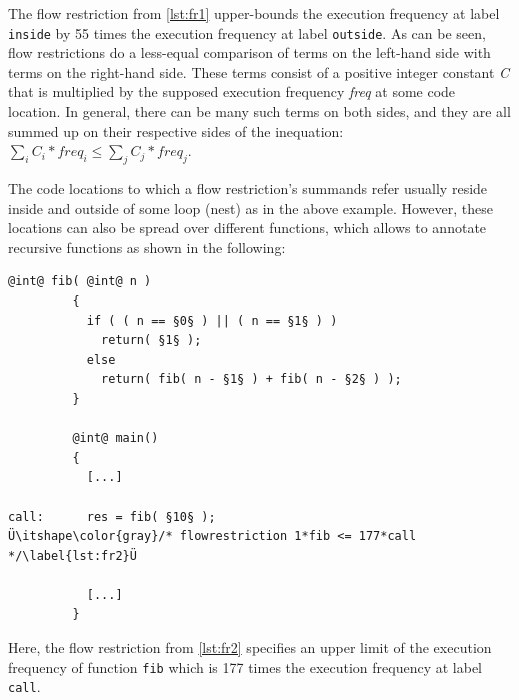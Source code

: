 The flow restriction from \cref{lst:fr1} upper-bounds the execution frequency at label \texttt{inside} by 55 times the execution frequency at label \texttt{outside}.
As can be seen, flow restrictions do a less-equal comparison of terms on the left-hand side with terms on the right-hand side.
These terms consist of a positive integer constant \textit{C} that is multiplied by the supposed execution frequency \textit{freq} at some code location.
In general, there can be many such terms on both sides, and they are all summed up on their respective sides of the inequation:
$\sum\limits_\textit{i} \textit{C}_\textit{i} \ast \textit{freq}_\textit{i} \leq \sum\limits_\textit{j} \textit{C}_\textit{j} \ast \textit{freq}_\textit{j}$.

The code locations to which a flow restriction's summands refer usually reside inside and outside of some loop (nest) as in the above example.
However, these locations can also be spread over different functions, which allows to annotate recursive functions as shown in the following:

\begin{lstlisting}[style=code,float=!h]
         @int@ fib( @int@ n )
         {
           if ( ( n == §0§ ) || ( n == §1§ ) )
             return( §1§ );
           else
             return( fib( n - §1§ ) + fib( n - §2§ ) );
         }

         @int@ main()
         {
           [...]

call:      res = fib( §10§ );                   Ü\itshape\color{gray}/* flowrestriction 1*fib <= 177*call */\label{lst:fr2}Ü

           [...]
         }
\end{lstlisting}

Here, the flow restriction from \cref{lst:fr2} specifies an upper limit of the execution frequency of function \texttt{fib} which is 177 times the execution frequency at label \texttt{call}.

